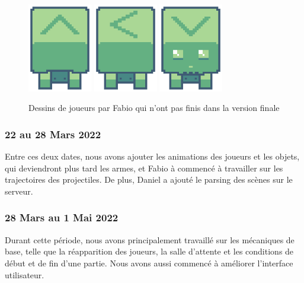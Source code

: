 \documentclass[a4paper]{article}
\begin{document}
\begin{figure}
	\centering
    \includegraphics[width=0.25\textwidth]{images/players/back.png}
    \includegraphics[width=0.25\textwidth]{images/players/side.png}
    \includegraphics[width=0.25\textwidth]{images/players/forward.png}
    \caption{Dessins de joueurs par Fabio qui n'ont pas finis dans la version finale}
    \label{fig:players}
\end{figure}

\subsubsection{22 au 28 Mars 2022}
Entre ces deux dates,  nous avons ajouter les animations des joueurs et les objets, qui deviendront plus tard les armes, et Fabio à commencé à travailler sur les trajectoires des projectiles. De plus, Daniel a ajouté le parsing des scènes sur le serveur.

\subsubsection{28 Mars au 1 Mai 2022}
Durant cette période, nous avons principalement travaillé sur les mécaniques de base, telle que la réapparition des joueurs, la salle d'attente et les conditions de début et de fin d'une partie. Nous avons aussi commencé à améliorer l'interface utilisateur.
\end{document}
